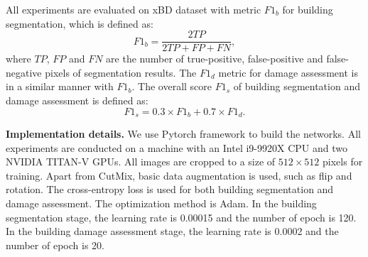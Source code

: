 \documentclass{article}
\begin{document}
All experiments are evaluated on xBD dataset with metric $F1_b$ for building segmentation, which is defined as:
\begin{equation}
F1_b = \frac{2TP}{2TP+FP+FN},
\label{eqF1}
\end{equation}
where $TP$, $FP$ and $FN$ are the number of true-positive, false-positive and false-negative pixels of segmentation results. The $F1_d$ metric for damage assessment is in a similar manner with $F1_b$. The overall score $F1_s$ of building segmentation and damage assessment is defined as:
\begin{equation}
F1_s = 0.3 \times F1_b + 0.7 \times F1_d.
\label{eqOveral}
\end{equation}

\textbf{Implementation details.}
We use Pytorch framework to build the networks. All experiments are conducted on a machine with an Intel i9-9920X CPU and two NVIDIA TITAN-V GPUs. All images are cropped to a size of $512\times 512$ pixels for training. Apart from CutMix, basic data augmentation is used, such as flip and rotation. The cross-entropy loss is used for both building segmentation and damage assessment. The optimization method is Adam. In the building segmentation stage, the learning rate is 0.00015 and the number of epoch is 120. In the building damage assessment stage, the learning rate is 0.0002 and the number of epoch is 20.
\end{document}
